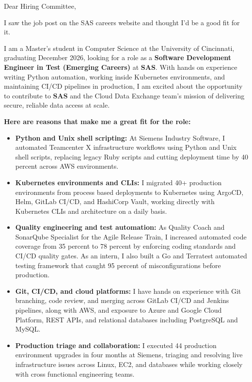 \documentclass[11pt]{letter}
\date{}
\begin{document}
\begin{letter}{}

\opening{Dear Hiring Committee,}

I saw the job post on the SAS careers website and thought I'd be a good fit for it.

I am a Master's student in Computer Science at the University of Cincinnati, graduating December 2026, looking for a role as a \textbf{Software Development Engineer in Test (Emerging Careers)} at \textbf{SAS}. With hands on experience writing Python automation, working inside Kubernetes environments, and maintaining CI/CD pipelines in production, I am excited about the opportunity to contribute to \textbf{SAS} and the Cloud Data Exchange team's mission of delivering secure, reliable data access at scale.

\textbf{Here are reasons that make me a great fit for the role:}

\begin{itemize}[leftmargin=*, itemsep=0.45em]
    \item \textbf{Python and Unix shell scripting:} At Siemens Industry Software, I automated Teamcenter X infrastructure workflows using Python and Unix shell scripts, replacing legacy Ruby scripts and cutting deployment time by 40 percent across AWS environments.

    \item \textbf{Kubernetes environments and CLIs:} I migrated 40+ production environments from process based deployments to Kubernetes using ArgoCD, Helm, GitLab CI/CD, and HashiCorp Vault, working directly with Kubernetes CLIs and architecture on a daily basis.

    \item \textbf{Quality engineering and test automation:} As Quality Coach and SonarQube Specialist for the Agile Release Train, I increased automated code coverage from 35 percent to 78 percent by enforcing coding standards and CI/CD quality gates. As an intern, I also built a Go and Terratest automated testing framework that caught 95 percent of misconfigurations before production.

    \item \textbf{Git, CI/CD, and cloud platforms:} I have hands on experience with Git branching, code review, and merging across GitLab CI/CD and Jenkins pipelines, along with AWS, and exposure to Azure and Google Cloud Platform, REST APIs, and relational databases including PostgreSQL and MySQL.

    \item \textbf{Production triage and collaboration:} I executed 44 production environment upgrades in four months at Siemens, triaging and resolving live infrastructure issues across Linux, EC2, and databases while working closely with cross functional engineering teams.
\end{itemize}


\end{letter}
\end{document}
